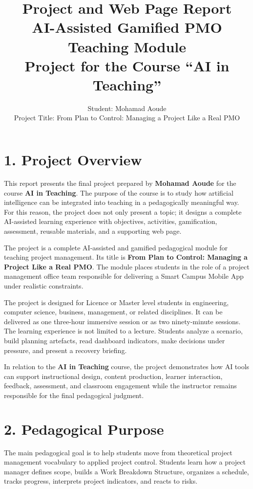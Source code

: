 \documentclass[11pt,a4paper]{article}
\title{\textbf{Project and Web Page Report}\\AI-Assisted Gamified PMO Teaching Module\\\large Project for the Course ``AI in Teaching''}
\author{Student: Mohamad Aoude\\Project Title: From Plan to Control: Managing a Project Like a Real PMO}
\date{}
\begin{document}
\maketitle

\section*{1. Project Overview}

This report presents the final project prepared by \textbf{Mohamad Aoude} for the course \textbf{AI in Teaching}. The purpose of the course is to study how artificial intelligence can be integrated into teaching in a pedagogically meaningful way. For this reason, the project does not only present a topic; it designs a complete AI-assisted learning experience with objectives, activities, gamification, assessment, reusable materials, and a supporting web page.

The project is a complete AI-assisted and gamified pedagogical module for teaching project management. Its title is \textbf{From Plan to Control: Managing a Project Like a Real PMO}. The module places students in the role of a project management office team responsible for delivering a Smart Campus Mobile App under realistic constraints.

The project is designed for Licence or Master level students in engineering, computer science, business, management, or related disciplines. It can be delivered as one three-hour immersive session or as two ninety-minute sessions. The learning experience is not limited to a lecture. Students analyze a scenario, build planning artefacts, read dashboard indicators, make decisions under pressure, and present a recovery briefing.

In relation to the \textbf{AI in Teaching} course, the project demonstrates how AI tools can support instructional design, content production, learner interaction, feedback, assessment, and classroom engagement while the instructor remains responsible for the final pedagogical judgment.

\section*{2. Pedagogical Purpose}

The main pedagogical goal is to help students move from theoretical project management vocabulary to applied project control. Students learn how a project manager defines scope, builds a Work Breakdown Structure, organizes a schedule, tracks progress, interprets project indicators, and reacts to risks.
\end{document}
